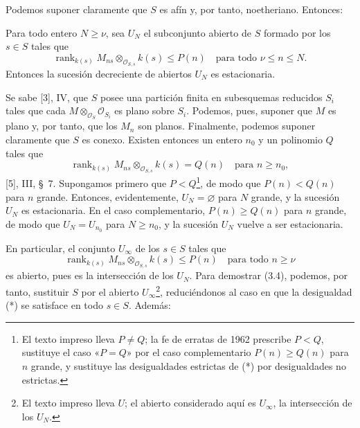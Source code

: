 Podemos suponer claramente que $S$ es afín y, por tanto, noetheriano. Entonces:

 Para todo entero $N\geq\nu$, sea $U_N$ el subconjunto
abierto de $S$ formado por los $s\in S$ tales que
\[
\operatorname{rank}_{k(s)}
M_{ns}\otimes_{\mathcal O_{S,s}}k(s)\leq P(n)
\quad\text{para todo $\nu\leq n\leq N$}.
\]
Entonces la sucesión decreciente de abiertos $U_N$ es estacionaria.

Se sabe [3], IV, que $S$ posee una partición finita en subesquemas reducidos
$S_i$ tales que cada $M\otimes_{\mathcal O_S}\mathcal O_{S_i}$ es plano sobre
$S_i$. Podemos, pues, suponer que $M$ es plano y, por tanto, que los $M_n$ son
planos. Finalmente, podemos suponer claramente que $S$ es conexo. Existen
entonces un entero $n_0$ y un polinomio $Q$ tales que
\[
\operatorname{rank}_{k(s)}
M_{ns}\otimes_{\mathcal O_{S,s}}k(s)=Q(n)
\quad\text{para $n\geq n_0$},
\]
[5], III, \S~7. Supongamos primero que $P<Q$\footnote{El texto impreso lleva
$P\neq Q$; la fe de erratas de 1962 prescribe $P<Q$, sustituye el caso «$P=Q$» por
el caso complementario $P(n)\geq Q(n)$ para $n$ grande, y sustituye las
desigualdades estrictas de (*) por desigualdades no estrictas.}, de modo que
$P(n)<Q(n)$ para $n$ grande. Entonces, evidentemente, $U_N=\varnothing$ para
$N$ grande, y la sucesión $U_N$ es estacionaria. En el caso complementario,
$P(n)\geq Q(n)$ para $n$ grande, de modo que $U_N=U_{n_0}$ para $N\geq n_0$,
y la sucesión $U_N$ vuelve a ser estacionaria.

En particular, el conjunto $U_\infty$ de los $s\in S$ tales que
\[
\tag{*}
\operatorname{rank}_{k(s)}
M_{ns}\otimes_{\mathcal O_{S,s}}k(s)\leq P(n)
\quad\text{para todo $n\geq\nu$}
\]
es abierto, pues es la intersección de los $U_N$. Para demostrar (3.4),
podemos, por tanto, sustituir $S$ por el abierto $U_\infty$\footnote{El texto impreso lleva $U$; el abierto considerado aquí es $U_\infty$, la intersección de los $U_N$.}, reduciéndonos al caso en
que la desigualdad (*) se satisface en todo $s\in S$. Además:

